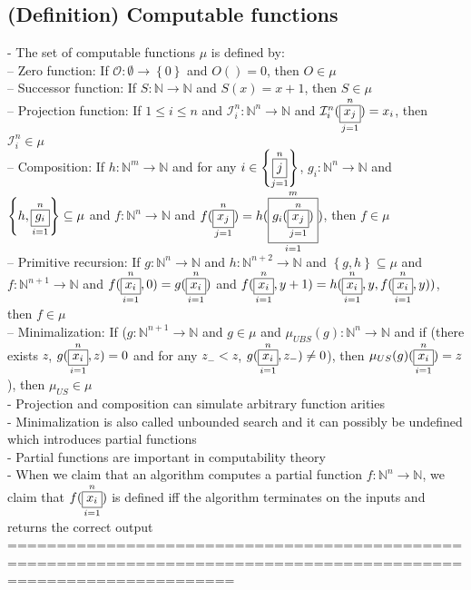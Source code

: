 \documentclass{book}
\newcommand{\inot}{\not}
\newcommand{\set}[1]{\left\{ #1 \right\}}
\newcommand{\vdc}[3]{\underset{#2}{\overset{#3}{\fbox{$#1$}}}}
\begin{document}
\subsection{(Definition) Computable functions} %
	- The set of computable functions $\mu$ is defined by: \\
		-- Zero function: If $\mathcal{O}: \emptyset \rightarrow \set{0}$ and $O() = 0$, then $O \in \mu$ \\
		-- Successor function: If $S: \mathbb{N} \rightarrow \mathbb{N}$ and $S(x) = x + 1$, then $S \in \mu$ \\
		-- Projection function: If $1 \leq i \leq n$ and $\mathcal{I}_i^n: \mathbb{N}^n \rightarrow \mathbb{N}$ and $\mathcal{I}_i^n(\vdc{x_j}{j=1}{n}) = x_i$, then $\mathcal{I}_i^n \in \mu$ \\
		-- Composition: If $h: \mathbb{N}^m \rightarrow \mathbb{N}$ and for any $i \in \set{\vdc{j}{j=1}{n}}$, $g_i: \mathbb{N}^n \rightarrow \mathbb{N}$ and $\set{h, \vdc{g_i}{i=1}{n}} \subseteq \mu$ and $f: \mathbb{N}^n \rightarrow \mathbb{N}$ and $f(\vdc{x_j}{j=1}{n}) = h(\vdc{g_i(\vdc{x_j}{j=1}{n})}{i=1}{m})$, then $f \in \mu$ \\
		-- Primitive recursion: If $g: \mathbb{N}^n \rightarrow \mathbb{N}$ and $h: \mathbb{N}^{n+2} \rightarrow \mathbb{N}$ and $\set{g, h} \subseteq \mu$ and $f: \mathbb{N}^{n+1} \rightarrow \mathbb{N}$ and $f(\vdc{x_i}{i=1}{n}, 0) = g(\vdc{x_i}{i=1}{n})$ and $f(\vdc{x_i}{i=1}{n}, y+1) = h(\vdc{x_i}{i=1}{n}, y, f(\vdc{x_i}{i=1}{n}, y))$, then $f \in \mu$ \\
		-- Minimalization: If ($g: \mathbb{N}^{n+1} \rightarrow \mathbb{N}$ and $g \in \mu$ and $\mu_{UBS}(g): \mathbb{N}^n \rightarrow \mathbb{N}$ and if (there exists $z$, $g(\vdc{x_i}{i=1}{n}, z) = 0$ and for any $z_- < z$, $g(\vdc{x_i}{i=1}{n}, z_-) \inot = 0$), then $\mu_{US}(g)(\vdc{x_i}{i=1}{n}) = z$), then $\mu_{US} \in \mu$ \\
	- Projection and composition can simulate arbitrary function arities \\
	- Minimalization is also called unbounded search and it can possibly be undefined which introduces partial functions \\
	- Partial functions are important in computability theory \\
	- When we claim that an algorithm computes a partial function $f: \mathbb{N}^n \rightarrow \mathbb{N}$, we claim that $f(\vdc{x_i}{i=1}{n})$ is defined iff the algorithm terminates on the inputs and returns the correct output \\
	===================================================================================================================
\end{document}
